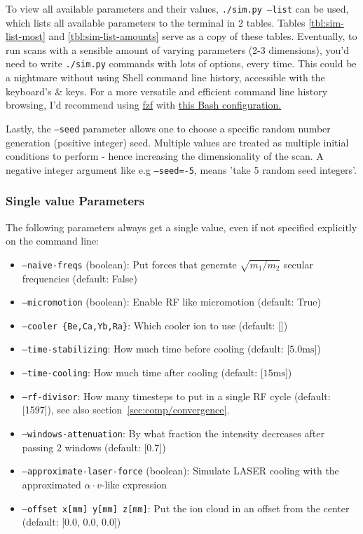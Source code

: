 To view all available parameters and their values, \texttt{./sim.py --list} can be used, which lists all available parameters to the terminal in 2 tables. Tables \ref{tbl:sim-list-most} and \ref{tbl:sim-list-amounts} serve as a copy of these tables. Eventually, to run scans with a sensible amount of varying parameters (2-3 dimensions), you'd need to write \texttt{./sim.py} commands with lots of options, every time. This could be a nightmare without using Shell command line history, accessible with the keyboard's \keys{\arrowkeyup} \& \keys{\arrowkeydown} keys. For a more versatile and efficient command line history browsing, I'd recommend using \href{https://github.com/junegunn/fzf}{fzf} with \href{https://github.com/junegunn/fzf/blob/d24b58ef3fc6d6d2c43e07a44e0f757b9bdfbeff/shell/key-bindings.bash#L133-L136}{this Bash configuration.}

Lastly, the \texttt{--seed} parameter allows one to choose a specific random number generation (positive integer) seed. Multiple values are treated as multiple initial conditions to perform - hence increasing the dimensionality of the scan. A negative integer argument like e.g \texttt{--seed=-5}, means 'take 5 random seed integers'.

\subsubsection{Single value Parameters}\label{sssec:manual/single-value-params}

The following parameters always get a single value, even if not specified explicitly on the command line:

\begin{itemize}%
    \item \texttt{--naive-freqs} (boolean): Put forces that generate $\sqrt{m_1/m_2}$ secular frequencies (default: False)
    \item \texttt{--micromotion} (boolean): Enable RF like micromotion (default: True)
    \item \texttt{--cooler \{Be,Ca,Yb,Ra\}}: Which cooler ion to use (default: [])
    \item \texttt{--time-stabilizing}: How much time before cooling (default: [$5.0 \mathrm{ms}$])
    \item \texttt{--time-cooling}: How much time after cooling (default: [$15 \mathrm{ms}$])
    \item \texttt{--rf-divisor}: How many timesteps to put in a single RF cycle (default: [1597]), see also section~\ref{sec:comp/convergence}.
    \item \texttt{--windows-attenuation}: By what fraction the intensity decreases after passing 2 windows (default: [0.7])
    \item \texttt{--approximate-laser-force} (boolean): Simulate LASER cooling with the approximated $\alpha \cdot v$-like expression
    \item \texttt{--offset x[mm] y[mm] z[mm]}: Put the ion cloud in an offset from the center (default: [0.0, 0.0, 0.0])
\end{itemize}

